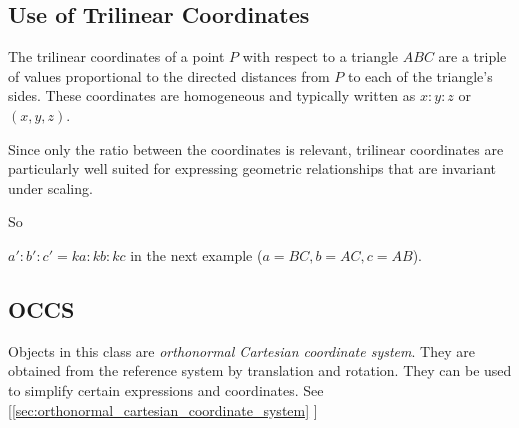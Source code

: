 
\subsection{Use of Trilinear Coordinates} %
\label{sub:use_of_trilinear_coordinates}

The trilinear coordinates of a point $P$ with respect to a triangle $ABC$ are a triple of values proportional to the directed distances from $P$ to each of the triangle’s sides. These coordinates are homogeneous and typically written as $x : y : z$ or $(x, y, z)$.

Since only the ratio between the coordinates is relevant, trilinear coordinates are particularly well suited for expressing geometric relationships that are invariant under scaling.

So

$ a' : b' : c' = ka : kb : kc$ in the next example ($a = BC, b = AC, c = AB$).


\begin{minipage}{.5\textwidth}
\end{minipage}
\begin{minipage}{.5\textwidth}
\begin{tkzexample}
\end{tkzexample}
\end{minipage}


\subsection{OCCS} %
\label{sub:occs}

Objects in this class are \emph{orthonormal Cartesian coordinate system}. They are obtained from the reference system by translation and rotation. They can be used to simplify certain expressions and coordinates.
See  [\ref{sec:orthonormal_cartesian_coordinate_system}
]
